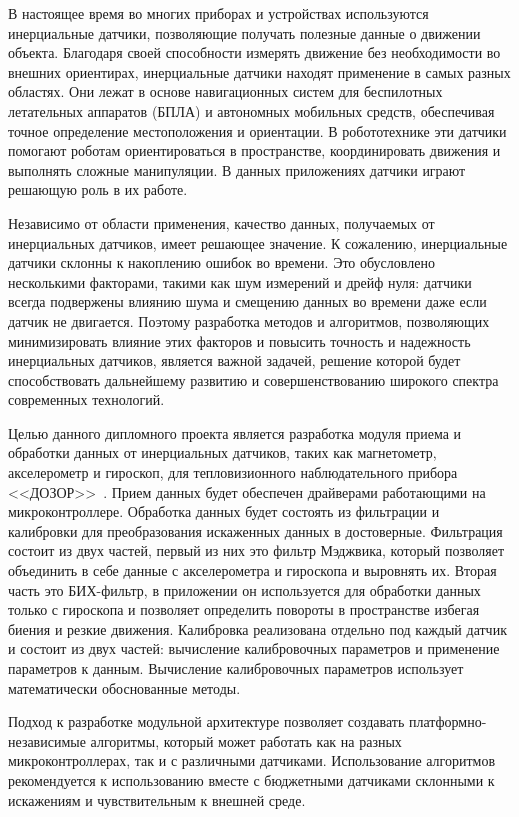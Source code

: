 \label{sec:intro}

В настоящее время во многих приборах и устройствах используются инерциальные датчики, 
позволяющие получать полезные данные о движении объекта.
Благодаря своей способности измерять движение без необходимости во внешних ориентирах, 
инерциальные датчики находят применение в самых разных областях. Они лежат в основе навигационных 
систем для беспилотных летательных аппаратов (БПЛА) и автономных мобильных средств, обеспечивая 
точное определение местоположения и ориентации. В робототехнике эти датчики помогают роботам 
ориентироваться в пространстве, координировать движения и выполнять сложные манипуляции.
В данных приложениях датчики играют решающую роль в их работе.

Независимо от области применения, качество данных, получаемых от инерциальных датчиков, имеет решающее значение.
К сожалению, инерциальные датчики склонны к накоплению ошибок во времени. Это обусловлено несколькими факторами, 
такими как шум измерений и дрейф нуля: датчики всегда подвержены влиянию шума и смещению данных во времени даже если датчик не двигается.
Поэтому разработка методов и алгоритмов, позволяющих минимизировать влияние этих факторов и повысить точность и надежность инерциальных датчиков,
является важной задачей, решение которой будет способствовать дальнейшему развитию и совершенствованию широкого спектра современных технологий.

Целью данного дипломного проекта является разработка модуля приема и обработки данных от инерциальных датчиков,
таких как магнетометр, акселерометр и гироскоп, для тепловизионного наблюдательного прибора <<ДОЗОР>>~.
Прием данных будет обеспечен драйверами работающими на микроконтроллере.
Обработка данных будет состоять из фильтрации и калибровки для преобразования искаженных данных в достоверные. 
Фильтрация состоит из двух частей, первый из них это фильтр Мэджвика, который позволяет объединить в себе данные с 
акселерометра и гироскопа и выровнять их. Вторая часть это БИХ-фильтр, в приложении он используется для обработки данных только с гироскопа
и позволяет определить повороты в пространстве избегая биения и резкие движения. 
Калибровка реализована отдельно под каждый датчик и состоит из двух частей: вычисление калибровочных параметров и применение параметров к данным.
Вычисление калибровочных параметров использует математически обоснованные методы. 

Подход к разработке модульной архитектуре позволяет создавать платформно-независимые алгоритмы, который может работать как на разных 
микроконтроллерах, так и с различными датчиками. Использование алгоритмов рекомендуется к использованию вместе с 
бюджетными датчиками склонными к искажениям и чувствительным к
внешней среде. 

